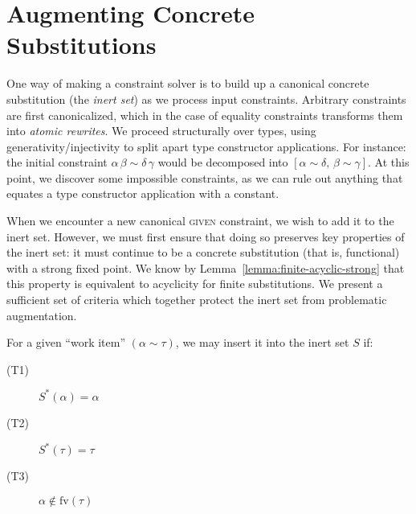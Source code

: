 \documentclass[10pt, letterpaper, oneside]{article}
\newcommand{\given}  {\textsc{given} \xpsace}
\newcommand{\fv}{\mathrm{fv}}
\begin{document}
\section{Augmenting Concrete Substitutions}

One way of making a constraint solver is to build up a canonical concrete substitution (the \emph{inert set}) as we process input constraints. Arbitrary constraints are first canonicalized, which in the case of equality constraints transforms them into \emph{atomic rewrites}. We proceed structurally over types, using generativity/injectivity to split apart type constructor applications. For instance: the initial constraint \(\alpha\, \beta \sim \delta\, \gamma\) would be decomposed into \([\alpha \sim \delta,\, \beta \sim \gamma]\). At this point, we discover some impossible constraints, as we can rule out anything that equates a type constructor application with a constant.

When we encounter a new canonical \given constraint, we wish to add it to the inert set. However, we must first ensure that doing so preserves key properties of the inert set: it must continue to be a concrete substitution (that is, functional) with a strong fixed point. We know by Lemma~\ref{lemma:finite-acyclic-strong} that this property is equivalent to acyclicity for finite substitutions. We present a sufficient set of criteria which together protect the inert set from problematic augmentation.






For a given ``work item'' \((\alpha \sim \tau)\), we may insert it into the inert set \(S\) if:

\begin{description}
\item[(T1)] \(S^\ast(\alpha) = \alpha\)
\item[(T2)] \(S^\ast(\tau) = \tau\)
\item[(T3)] \(\alpha \notin \fv(\tau)\)
\end{description}
\end{document}
